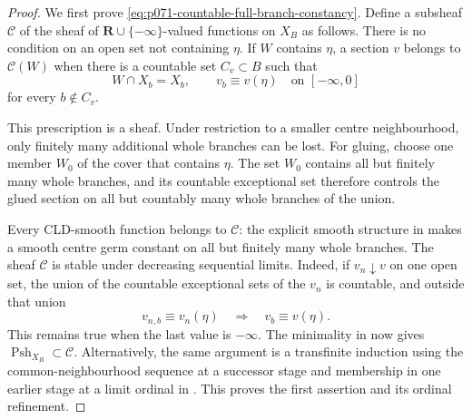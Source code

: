 
\begin{proof}
We first prove \eqref{eq:p071-countable-full-branch-constancy}.  Define a
subsheaf \(\mathscr C\) of the sheaf of
\(\mathbf R\cup\{-\infty\}\)-valued functions on \(X_B\) as follows.  There
is no condition on an open set not containing \(\eta\).  If \(W\) contains
\(\eta\), a section \(v\) belongs to \(\mathscr C(W)\) when there is a
countable set \(C_v\subset B\) such that
\[
 W\cap X_b=X_b,
 \qquad v_b\equiv v(\eta)
 \quad\text{on }[-\infty,0]
\]
for every \(b\notin C_v\).

This prescription is a sheaf.  Under restriction to a smaller centre
neighbourhood, only finitely many additional whole branches can be lost.
For gluing, choose one member \(W_0\) of the cover that contains \(\eta\).
The set \(W_0\) contains all but finitely many whole branches, and its
countable exceptional set therefore controls the glued section on all but
countably many whole branches of the union.

Every CLD-smooth function belongs to \(\mathscr C\): the explicit smooth
structure in \cite[\S6.7.3]{CLD25} makes a smooth centre germ constant on
all but finitely many whole branches.  The sheaf \(\mathscr C\) is stable
under decreasing sequential limits.  Indeed, if \(v_n\downarrow v\) on
one open set, the union of the countable exceptional sets of the \(v_n\)
is countable, and outside that union
\[
 v_{n,b}\equiv v_n(\eta)
 \quad\Longrightarrow\quad
 v_b\equiv v(\eta).
\]
This remains true when the last value is \(-\infty\).  The minimality in
\cite[Definition~8.1.1]{CLD25} now gives
\(\operatorname{Psh}_{X_B}\subset\mathscr C\).  Alternatively, the same
argument is a transfinite induction using the common-neighbourhood sequence
at a successor stage and membership in one earlier stage at a limit ordinal
in \cite[Lemma~8.1.4]{CLD25}.  This proves the first assertion and its
ordinal refinement.


\end{proof}
